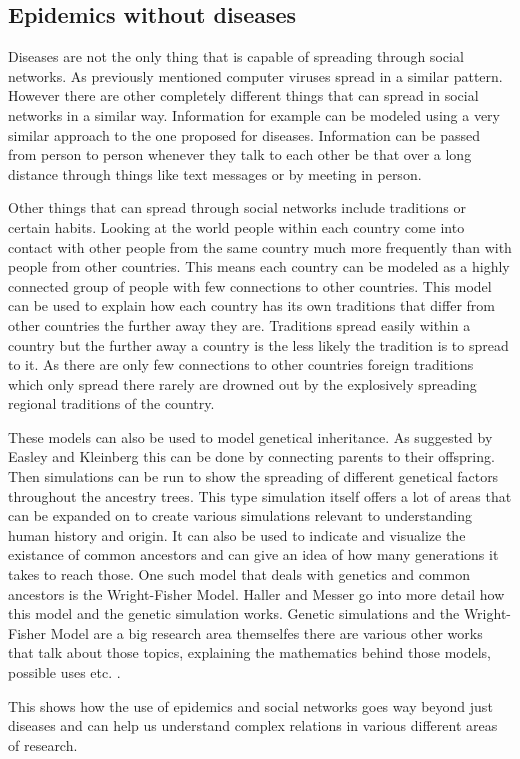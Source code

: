 \subsection{Epidemics without diseases}
Diseases are not the only thing that is capable of spreading through social networks. As
previously mentioned computer viruses spread in a similar pattern. However there are other
completely different things that can spread in social networks in a similar way.
Information for example can be modeled using a very similar approach to the one proposed
for diseases. Information can be passed from person to person whenever they talk to each other
be that over a long distance through things like text messages or by meeting in person.

Other things that can spread through social networks include traditions or certain habits.
Looking at the world people within each country come into contact with other people from the
same country much more frequently than with people from other countries. This means each
country can be modeled as a highly connected group of people with few connections to other
countries. This model can be used to explain how each country has its own traditions that
differ from other countries the further away they are. Traditions spread easily within 
a country but the further away a country is the less likely the tradition is to spread to it.
As there are only few connections to other countries foreign traditions which only spread there
rarely are drowned out by the explosively spreading regional traditions of the country.

These models can also be used to model genetical inheritance. As suggested by
Easley and Kleinberg \cite{networks} this can be done by connecting parents to their offspring.
Then simulations can be run to show the spreading of different genetical factors throughout
the ancestry trees. This type simulation itself offers a lot of areas that can be expanded
on to create various simulations relevant to understanding human history and origin. 
It can also be used to indicate and visualize the existance of common ancestors and 
can give an idea of how many generations it takes to reach those. One such model that deals
with genetics and common ancestors is the Wright-Fisher Model. Haller and Messer \cite{genetics}
go into more detail how this model and the genetic simulation works. Genetic simulations 
and the Wright-Fisher Model are a big research area themselfes there are various other
works that talk about those topics, explaining the mathematics behind those models, 
possible uses etc. \cite{genetics2} \cite{genetics3} \cite{genetics4}.


This shows how the use of epidemics and social networks goes way beyond just diseases and
can help us understand complex relations in various different areas of research.